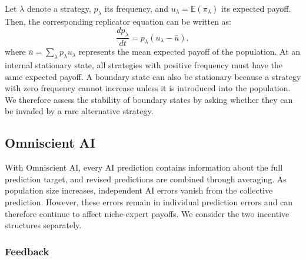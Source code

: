\documentclass[12pt]{article}
\begin{document}
Let $\lambda$ denote a strategy, $p_\lambda$ its frequency, and $u_\lambda=\mathbb{E}(\pi_\lambda)$ its expected payoff.
Then, the corresponding replicator equation can be written as:
\begin{equation}
\frac{dp_\lambda}{dt} = p_\lambda(u_\lambda-\bar{u}),
\end{equation}
where $\bar{u}=\sum_\lambda p_\lambda u_\lambda$ represents the mean expected payoff of the population. 
At an internal stationary state, all strategies with positive frequency must have the same expected payoff. 
A boundary state can also be stationary because a strategy with zero frequency cannot increase unless it is introduced into the population. 
We therefore assess the stability of boundary states by asking whether they can be invaded by a rare alternative strategy.

\subsection*{Omniscient AI}

With Omniscient AI, every AI prediction contains information about the full prediction target, and revised predictions are combined through averaging. 
As population size increases, independent AI errors vanish from the collective prediction. 
However, these errors remain in individual prediction errors and can therefore continue to affect niche-expert payoffs. 
We consider the two incentive structures separately.

\subsubsection*{Feedback}
\end{document}
